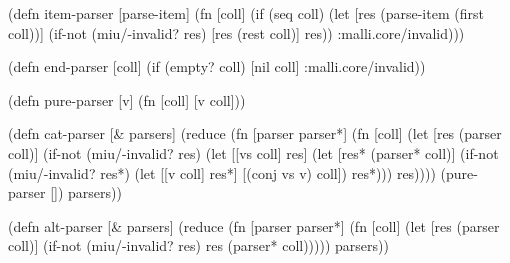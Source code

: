 \documentclass{beamer}
\begin{document}

\begin{frame}[fragile]

\begin{semiverbatim}
(defn item-parser [parse-item]
  (fn [coll]
    (if (seq coll)
      (let [res (parse-item (first coll))]
        (if-not (miu/-invalid? res)
          [res (rest coll)]
          res))
      :malli.core/invalid)))
\end{semiverbatim}

\begin{semiverbatim}
(defn end-parser [coll]
  (if (empty? coll)
    [nil coll]
    :malli.core/invalid))
\end{semiverbatim}

\end{frame}


\begin{frame}[fragile]

\begin{semiverbatim}
(defn pure-parser [v] (fn [coll] [v coll]))
\end{semiverbatim}

\begin{semiverbatim}
(defn cat-parser [& parsers]
  (reduce (fn [parser parser*]
            (fn [coll]
              (let [res (parser coll)]
                (if-not (miu/-invalid? res)
                  (let [[vs coll] res]
                    (let [res* (parser* coll)]
                      (if-not (miu/-invalid? res*)
                        (let [[v coll] res*]
                          [(conj vs v) coll])
                        res*)))
                  res))))
          (pure-parser []) parsers))
\end{semiverbatim}

\end{frame}


\begin{frame}[fragile]

\begin{semiverbatim}
(defn alt-parser [& parsers]
  (reduce (fn [parser parser*]
            (fn [coll]
              (let [res (parser coll)]
                (if-not (miu/-invalid? res)
                  res
                  (parser* coll)))))
          parsers))
\end{semiverbatim}

\end{frame}
\end{document}
